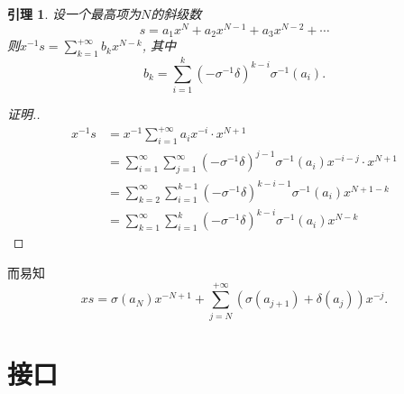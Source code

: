 \documentclass{article}
\newtheorem{lem}{引理}
\begin{document}
\begin{lem}
  设一个最高项为$N$的斜级数$$s=a_1 x^N+a_2 x^{N-1} + a_3 x^{N-2}+ \cdots $$
  则$x^{-1} s = \sum_{k=1}^{+\infty} b_k x^{N-k}$, 其中
  \begin{displaymath}
    b_k = \sum_{i=1}^k(-\sigma^{-1}\delta)^{k-i}\sigma^{-1}(a_i).
  \end{displaymath}
\end{lem}
\begin{proof}[证明.]
  \begin{align*}
    x^{-1} s &=  x^{-1} \sum_{i=1}^{+\infty}a_ix^{-i}\cdot x^{N+1} \\ 
    &= \sum_{i=1}^\infty \sum_{j=1}^\infty (-\sigma^{-1}\delta)^{j-1}\sigma^{-1}(a_i) x^{-i-j}\cdot
    x^{N+1}\\
    &=\sum_{k=2}^\infty\sum_{i=1}^{k-1}(-\sigma^{-1}\delta)^{k-i-1} \sigma^{-1}(a_i) x^{N+1-k}\\
    &=\sum_{k=1}^\infty\sum_{i=1}^k (-\sigma^{-1}\delta)^{k-i}\sigma^{-1}(a_i) x^{N-k}
  \end{align*}
\end{proof}
而易知
\begin{displaymath}
  x s = \sigma(a_N)x^{-N+1}+\sum_{j=N}^{+\infty}\left(\sigma(a_{j+1})+\delta(a_j)\right) x^{-j}.
\end{displaymath}

\section{接口}
\end{document}
